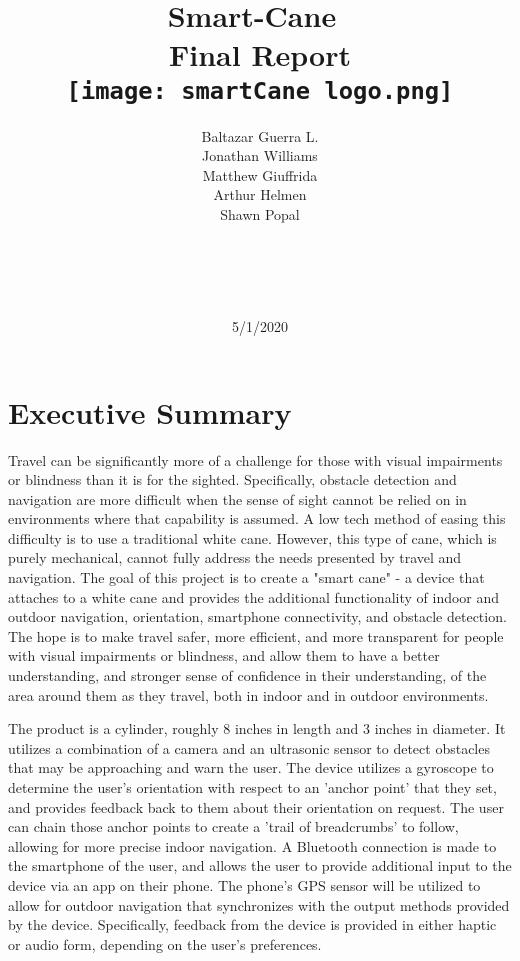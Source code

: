 \documentclass[letterpaper,12pt]{article}
\title{\textbf{\Huge Smart-Cane}\ \\ \textbf{\Huge Final Report} \\ \texttt{[image: smartCane logo.png]}\\ }
\author{Baltazar Guerra L.\\ Jonathan Williams \\ Matthew Giuffrida \\ Arthur Helmen \\ Shawn Popal \\ \\ \\ \\ \\}
\date{5/1/2020}
\begin{document}
\maketitle
\newpage
\tableofcontents
\newpage

\section{Executive Summary}
Travel can be significantly more of a challenge for those with visual impairments or blindness than it is for the sighted. Specifically, obstacle detection and navigation are more difficult when the sense of sight cannot be relied on in environments where that capability is assumed. A low tech method of easing this difficulty is to use a traditional white cane. However, this type of cane, which is purely mechanical, cannot fully address the needs presented by travel and navigation. The goal of this project is to create a "smart cane" - a device that attaches to a white cane and provides the additional functionality of indoor and outdoor navigation, orientation, smartphone connectivity, and obstacle detection. The hope is to make travel safer, more efficient, and more transparent for people with visual impairments or blindness, and allow them to have a better understanding, and stronger sense of confidence in their understanding, of the area around them as they travel, both in indoor and in outdoor environments. \par

The product is a cylinder, roughly 8 inches in length and 3 inches in diameter. It utilizes a combination of a camera and an ultrasonic sensor to detect obstacles that may be approaching and warn the user. The device utilizes a gyroscope to determine the user's orientation with respect to an 'anchor point' that they set, and provides feedback back to them about their orientation on request. The user can chain those anchor points to create a 'trail of breadcrumbs' to follow, allowing for more precise indoor navigation. A Bluetooth connection is made to the smartphone of the user, and allows the user to provide additional input to the device via an app on their phone. The phone's GPS sensor will be utilized to allow for outdoor navigation that synchronizes with the output methods provided by the device. Specifically, feedback from the device is provided in either haptic or audio form, depending on the user's preferences. \par
\end{document}
